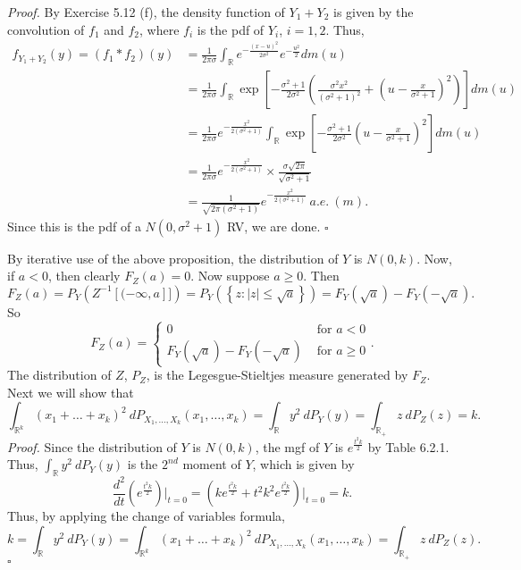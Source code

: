 \documentclass[12pt]{article}
\newcounter{ProofCounter}
\newenvironment{Proof}{\stepcounter{ProofCounter}\textit{Proof.}}{\hfill$\square$}
\begin{document}
\begin{enumerate}[label=(\alph*)]
\begin{Proof}
By Exercise 5.12 (f), the density function of $Y_{1} + Y_{2}$ is given by the convolution of $f_{1}$ and $f_{2}$, where $f_{i}$ is the pdf of $Y_{i}$,
$i = 1,2$. Thus,
\begin{align*}
f_{Y_{1} + Y_{2}}(y) = (f_{1} * f_{2})(y) & = \frac{1}{2\pi\sigma}\int_{\mathbb{R}}e^{-\frac{(x-u)^{2}}{2\sigma^{2}}}e^{-\frac{u^{2}}{2}}dm(u) \\
& = \frac{1}{2\pi\sigma} \int_{\mathbb{R}}\exp\left[ -\frac{\sigma^{2} + 1}{2\sigma^{2}}\left( \frac{\sigma^{2}x^{2}}{(\sigma^{2} + 1)^{2}} + \left(
u - \frac{x}{\sigma^{2} + 1} \right)^{2} \right) \right]dm(u) \\
& = \frac{1}{2\pi\sigma}e^{-\frac{x^{2}}{2(\sigma^{2} +1)}} \int_{\mathbb{R}} \exp \left[ -\frac{\sigma^{2}+1}{2\sigma^{2}}\left( u -
\frac{x}{\sigma^{2} + 1} \right)^{2} \right]dm(u) \\
& = \frac{1}{2\pi\sigma}e^{-\frac{x^{2}}{2(\sigma^{2} + 1)}} \times \frac{\sigma\sqrt{2\pi}}{\sqrt{\sigma^{2} + 1}} \\
& = \frac{1}{\sqrt{2\pi(\sigma^{2} + 1)}} e^{-\frac{x^{2}}{2(\sigma^{2} + 1)}} \ a.e.\  (m).
\end{align*}
Since this is the pdf of a $N(0, \sigma^{2} + 1)$ RV, we are done.
\end{Proof}

By iterative use of the above proposition, the distribution of $Y$ is $N(0,k)$. Now, if $a < 0$, then clearly $F_{Z}(a) = 0$. Now suppose $a \geq 0$. Then 
\[ F_{Z}(a) = P_{Y}\left( Z^{-1}[(-\infty, a]] \right) = P_{Y}\left( \left\{ z : |z| \leq \sqrt{a} \right\} \right) = F_{Y}(\sqrt{a}) -
F_{Y}(-\sqrt{a}). \]
So 
\[ F_{Z}(a) = \left\{ \begin{array}{cl}
0 & \text{ for } a < 0 \\
F_{Y}(\sqrt{a}) - F_{Y}(-\sqrt{a}) & \text{ for } a \geq 0 
\end{array} \right. .\]
The distribution of $Z$, $P_{Z}$, is the Legesgue-Stieltjes measure generated by $F_{Z}$. Next we will show that 
\[ \int_{\mathbb{R}^{k}}(x_{1} + \dots + x_{k})^{2}\ dP_{X_{1}, \hdots, X_{k}}(x_{1}, \hdots, x_{k}) = \int_{\mathbb{R}}y^{2}\ dP_{Y}(y) =
\int_{\mathbb{R}_{+}}z \ dP_{Z}(z) = k.\]
\begin{Proof}
Since the distribution of $Y$ is $N(0,k)$, the mgf of $Y$ is $e^{\frac{t^{2}k}{2}}$ by Table 6.2.1. Thus, 
$\int_{\mathbb{R}}y^{2}\ dP_{Y}(y)$ is the $2^{nd}$ moment of $Y$, which is given by 
\[ \frac{d^{2}}{dt} \left( e^{\frac{t^{2}k}{2}}\right)\bigg|_{t=0} = \left( ke^{\frac{t^{2}k}{2}} + t^{2}k^{2}e^{\frac{t^{2}k}{2}} \right)\bigg|_{t=0} = k. \]
Thus, by applying the change of variables formula, 
\[ k = \int_{\mathbb{R}}y^{2}\ dP_{Y}(y) = \int_{\mathbb{R}^{k}}(x_{1} + \dots + x_{k})^{2}\ dP_{X_{1}, \hdots, X_{k}}(x_{1}, \hdots, x_{k}) = 
\int_{\mathbb{R}_{+}}z \ dP_{Z}(z).\]
\end{Proof}


\end{enumerate}
\end{document}
